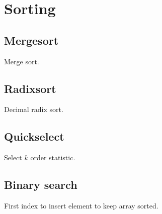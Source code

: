 \section{Sorting}

\subsection{Mergesort}
Merge sort.

\subsection{Radixsort}
Decimal radix sort.

\subsection{Quickselect}
Select $k$ order statistic.

\subsection{Binary search}
First index to insert element to keep array sorted.
